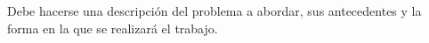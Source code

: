 Debe hacerse una descripción del problema a abordar, sus antecedentes y la forma en la que se realizará el  trabajo.
